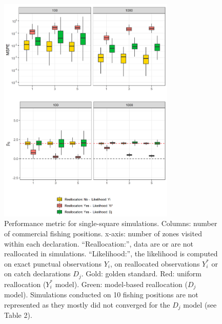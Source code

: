 \documentclass[
  english,
  man,floatsintext]{apa6}
\begin{document}
\begin{figure}
\centering
\includegraphics[width=0.75\textwidth,height=\textheight]{images/Perf.metric_single_square.png}
\caption{\label{fig:PerfMetricSingle} Performance metric for single-square simulations. Columns: number of commercial fishing positions. x-axis: number of zones visited within each declaration. \enquote{Reallocation:}, data are or are not reallocated in simulations. \enquote{Likelihood:}, the likelihood is computed on exact punctual observations \(Y_i\), on reallocated observations \(Y_i^*\) or on catch declarations \(D_j\). Gold: golden standard. Red: uniform reallocation (\(Y_i^*\) model). Green: model-based reallocation (\(D_j\) model). Simulations conducted on 10 fishing positions are not represented as they mostly did not converged for the \(D_j\) model (see Table 2).}
\end{figure}
\end{document}
